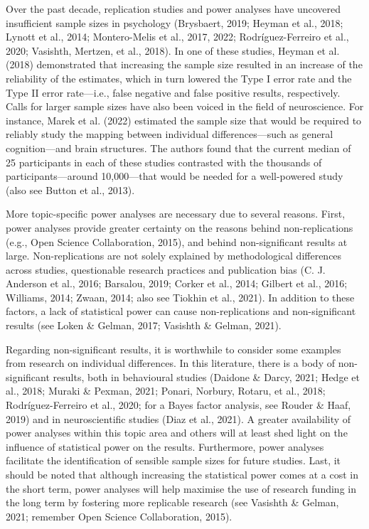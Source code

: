 \documentclass[
  12pt,
  man,floatsintext]{apa7}
\begin{document}
Over the past decade, replication studies and power analyses have uncovered insufficient sample sizes in psychology (Brysbaert, 2019; Heyman et al., 2018; Lynott et al., 2014; Montero-Melis et al., 2017, 2022; Rodríguez-Ferreiro et al., 2020; Vasishth, Mertzen, et al., 2018). In one of these studies, Heyman et al. (2018) demonstrated that increasing the sample size resulted in an increase of the reliability of the estimates, which in turn lowered the Type I error rate and the Type II error rate---i.e., false negative and false positive results, respectively. Calls for larger sample sizes have also been voiced in the field of neuroscience. For instance, Marek et al. (2022) estimated the sample size that would be required to reliably study the mapping between individual differences---such as general cognition---and brain structures. The authors found that the current median of 25 participants in each of these studies contrasted with the thousands of participants---around 10,000---that would be needed for a well-powered study (also see Button et al., 2013).

More topic-specific power analyses are necessary due to several reasons. First, power analyses provide greater certainty on the reasons behind non-replications (e.g., Open Science Collaboration, 2015), and behind non-significant results at large. Non-replications are not solely explained by methodological differences across studies, questionable research practices and publication bias (C. J. Anderson et al., 2016; Barsalou, 2019; Corker et al., 2014; Gilbert et al., 2016; Williams, 2014; Zwaan, 2014; also see Tiokhin et al., 2021). In addition to these factors, a lack of statistical power can cause non-replications and non-significant results (see Loken \& Gelman, 2017; Vasishth \& Gelman, 2021).

Regarding non-significant results, it is worthwhile to consider some examples from research on individual differences. In this literature, there is a body of non-significant results, both in behavioural studies (Daidone \& Darcy, 2021; Hedge et al., 2018; Muraki \& Pexman, 2021; Ponari, Norbury, Rotaru, et al., 2018; Rodríguez-Ferreiro et al., 2020; for a Bayes factor analysis, see Rouder \& Haaf, 2019) and in neuroscientific studies (Diaz et al., 2021). A greater availability of power analyses within this topic area and others will at least shed light on the influence of statistical power on the results. Furthermore, power analyses facilitate the identification of sensible sample sizes for future studies. Last, it should be noted that although increasing the statistical power comes at a cost in the short term, power analyses will help maximise the use of research funding in the long term by fostering more replicable research (see Vasishth \& Gelman, 2021; remember Open Science Collaboration, 2015).
\end{document}
